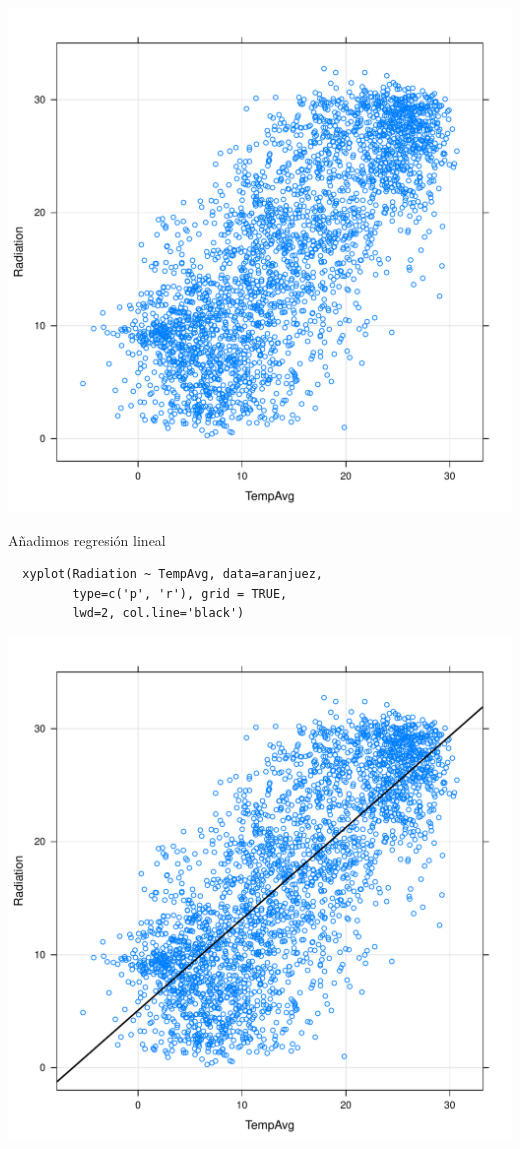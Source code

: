 \documentclass[xcolor={usenames,svgnames,dvipsnames}]{beamer}
\begin{document}
\begin{frame}[label=sec-2-1-5]{}
\includegraphics[width=.9\linewidth]{figs/xyplotPG.pdf}
\end{frame}


\begin{frame}[fragile,label=sec-2-1-6]{Añadimos regresión lineal}
 \lstset{language=R,label= ,caption= ,numbers=none}
\begin{lstlisting}
  xyplot(Radiation ~ TempAvg, data=aranjuez,
         type=c('p', 'r'), grid = TRUE,
         lwd=2, col.line='black')
\end{lstlisting}
\end{frame}

\begin{frame}[label=sec-2-1-7]{}
\includegraphics[width=.9\linewidth]{figs/xyplotPRG.pdf}
\end{frame}
\end{document}
